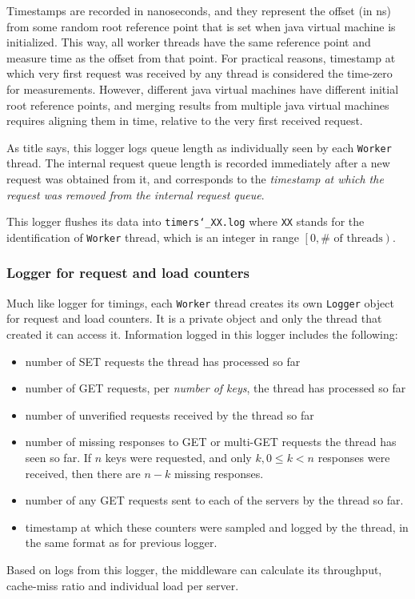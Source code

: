 \documentclass[11pt,a4paper]{article}
\begin{document}
Timestamps are recorded in nanoseconds, and they represent the offset (in ns) from some random root reference point that is set when java virtual machine is initialized. This way, all worker threads have the same reference point and measure time as the offset from that point. For practical reasons, timestamp at which very first request was received by any thread is considered the time-zero for measurements. However, different java virtual machines have different initial root reference points, and merging results from multiple java virtual machines requires aligning them in time, relative to the very first received request.

As title says, this logger logs queue length as individually seen by each \texttt{Worker} thread. The internal request queue length is recorded immediately after a new request was obtained from it, and corresponds to the \textit{timestamp at which the request was removed from the internal request queue}.

This logger flushes its data into \texttt{timers\char`_XX.log} where \texttt{XX} stands for the identification of \texttt{Worker} thread, which is an integer in range $\left[0, \#\text{ of threads}\right)$.

\subsubsection{Logger for request and load counters}

Much like logger for timings, each \texttt{Worker} thread creates its own \texttt{Logger} object for request and load counters. It is a private object and only the thread that created it can access it. Information logged in this logger includes the following:
\begin{itemize}
	\item number of SET requests the thread has processed so far
	\item number of GET requests, per \textit{number of keys}, the thread has processed so far
	\item number of unverified requests received by the thread so far
	\item number of missing responses to GET or multi-GET requests the thread has seen so far. If $n$ keys were requested, and only $k, 0 \le k < n$ responses were received, then there are $n - k$ missing responses.
	\item number of any GET requests sent to each of the servers by the thread so far.
	\item timestamp at which these counters were sampled and logged by the thread, in the same format as for previous logger.
\end{itemize} 
Based on logs from this logger, the middleware can calculate its throughput, cache-miss ratio and individual load per server.
\end{document}
